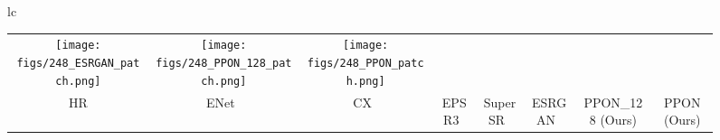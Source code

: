 \documentclass[preprint]{elsarticle}
\begin{document}
\begin{figure*}[htpb]
{\begin{tabular}{lc}
\begin{adjustbox}{valign=t}
\begin{tabular}{cccccccc}
					\hspace{-3mm}
					\texttt{[image: figs/248\_ESRGAN\_patch.png]} &
					\hspace{-3mm}
					\texttt{[image: figs/248\_PPON\_128\_patch.png]} &
					\hspace{-3mm}
					\texttt{[image: figs/248\_PPON\_patch.png]} \\
					
					HR & \hspace{-3mm} ENet~\cite{EnhanceNet} & \hspace{-3mm} CX~\cite{CX} & \hspace{-3mm} EPSR3~\cite{EPSR} & 
					SuperSR~\cite{ESRGAN} & \hspace{-3mm} ESRGAN~\cite{ESRGAN} & \hspace{-3mm} PPON\_128 (Ours) & \hspace{-3mm} PPON (Ours) \\
					

\end{tabular}
\end{adjustbox}
\end{tabular}}
\end{figure*}
\end{document}
